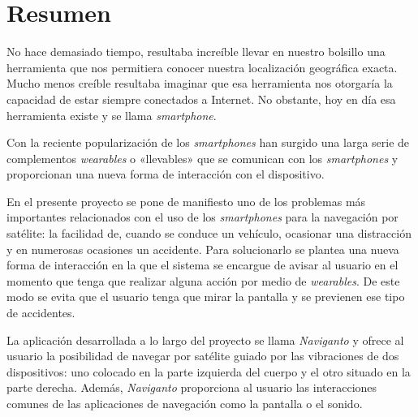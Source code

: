 \chapter{Resumen}

No hace demasiado tiempo, resultaba increíble llevar en nuestro bolsillo una herramienta que nos
permitiera conocer nuestra localización geográfica exacta. Mucho menos creíble resultaba imaginar
que esa herramienta nos otorgaría la capacidad de estar siempre conectados a Internet. No
obstante, hoy en día esa herramienta existe y se llama \emph{smartphone}.

Con la reciente popularización de los \emph{smartphones} han surgido una larga serie de complementos
\emph{wearables} o «llevables» que se comunican con los \emph{smartphones} y proporcionan una nueva
forma de interacción con el dispositivo.

En el presente proyecto se pone de manifiesto uno de los problemas más importantes relacionados con
el uso de los \emph{smartphones} para la navegación por satélite: la facilidad de, cuando se conduce
un vehículo, ocasionar una distracción y en numerosas ocasiones un accidente. Para solucionarlo se
plantea una nueva forma de interacción en la que el sistema se encargue de avisar al usuario en el
momento que tenga que realizar alguna acción por medio de \emph{wearables}. De este modo se evita
que el usuario tenga que mirar la pantalla y se previenen ese tipo de accidentes.

La aplicación desarrollada a lo largo del proyecto se llama \emph{Naviganto} y ofrece al usuario la
posibilidad de navegar por satélite guiado por las vibraciones de dos dispositivos: uno colocado en
la parte izquierda del cuerpo y el otro situado en la parte derecha. Además, \emph{Naviganto}
proporciona al usuario las interacciones comunes de las aplicaciones de navegación como la pantalla
o el sonido.

